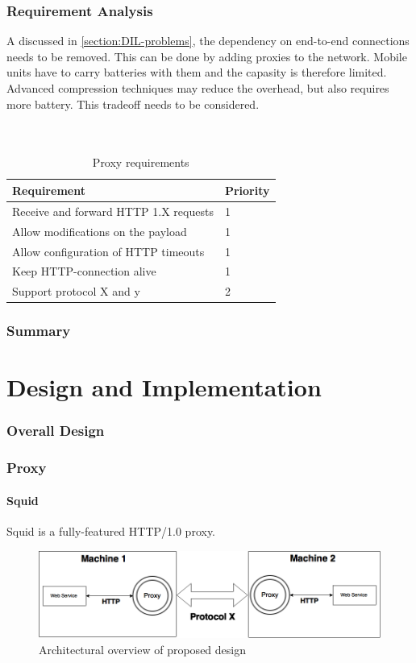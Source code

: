 \documentclass[USenglish]{article}
\begin{document}
\section{Requirement Analysis}
A discussed in \cref{section:DIL-problems}, the dependency on end-to-end connections needs to be removed. This can be done by adding proxies to the network.
Mobile units have to carry batteries with them and the capasity is therefore limited. Advanced compression techniques may reduce the overhead, but also requires more battery. This tradeoff needs to be considered.
\\ \\ \\
\begin{table}[h]
\begin{tabular}{| l | l |}
\hline
  \textbf{Requirement} & \textbf{Priority} \\ \hline
  Receive and forward HTTP 1.X requests & 1\\ \hline
  Allow modifications on the payload & 1 \\ \hline
  Allow configuration of HTTP timeouts & 1 \\ \hline
  Keep HTTP-connection alive & 1 \\ \hline
  Support protocol X and y & 2 \\ \hline
\end{tabular}
\caption{Proxy requirements}
\end{table}

\section{Summary}



\part{Design and Implementation}
\section{Overall Design}
\section{Proxy}
\subsection{Squid}
Squid is a fully-featured HTTP/1.0 proxy.
\begin{figure}[h]
\includegraphics[scale=0.4]{images/architecture.png}
\caption{Architectural overview of proposed design}
\end{figure}
\end{document}
